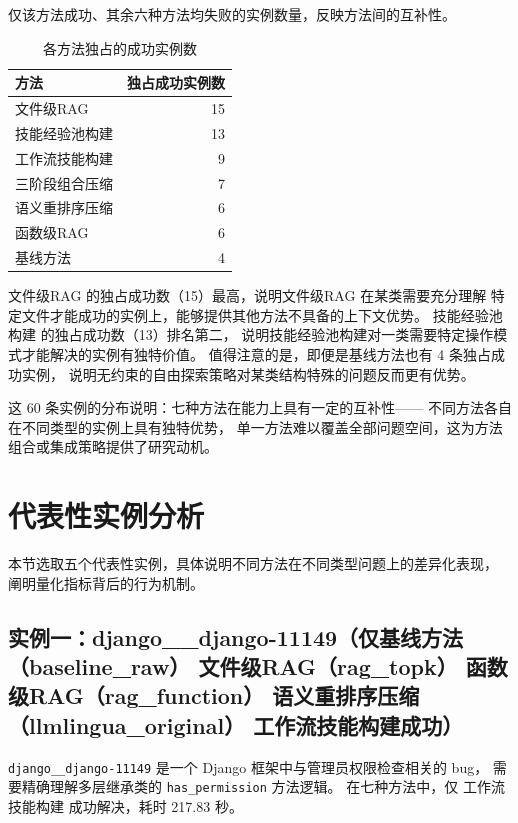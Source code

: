 \begin{table}[htbp]
  \centering
  \caption{各方法独占的成功实例数}
  {\footnotesize 仅该方法成功、其余六种方法均失败的实例数量，反映方法间的互补性。}
  \label{tab:exclusive-success}
  \begin{tabular}{lr}
    \toprule
    方法 & 独占成功实例数 \\
    \midrule
    文件级RAG           & 15 \\
    技能经验池构建   & 13 \\
    工作流技能构建  & 9  \\
    三阶段组合压缩   & 7  \\
    语义重排序压缩 & 6  \\
    函数级RAG       & 6  \\
    基线方法       & 4  \\
    \bottomrule
  \end{tabular}
\end{table}

文件级RAG 的独占成功数（15）最高，说明文件级RAG 在某类需要充分理解
特定文件才能成功的实例上，能够提供其他方法不具备的上下文优势。
技能经验池构建 的独占成功数（13）排名第二，
说明技能经验池构建对一类需要特定操作模式才能解决的实例有独特价值。
值得注意的是，即便是基线方法也有 4 条独占成功实例，
说明无约束的自由探索策略对某类结构特殊的问题反而更有优势。

这 60 条实例的分布说明：七种方法在能力上具有一定的互补性——
不同方法各自在不同类型的实例上具有独特优势，
单一方法难以覆盖全部问题空间，这为方法组合或集成策略提供了研究动机。


\section{代表性实例分析}
\label{sec:case-study}

本节选取五个代表性实例，具体说明不同方法在不同类型问题上的差异化表现，
阐明量化指标背后的行为机制。

\subsection{实例一：django\_\_django-11149（仅基线方法（baseline\_raw） 文件级RAG（rag\_topk） 函数级RAG（rag\_function） 语义重排序压缩（llmlingua\_original） 工作流技能构建成功）}
\label{subsec:case-django-11149}

\texttt{django\_\_django-11149} 是一个 Django 框架中与管理员权限检查相关的 bug，
需要精确理解多层继承类的 \texttt{has\_permission} 方法逻辑。
在七种方法中，仅 工作流技能构建 成功解决，耗时 217.83 秒。


